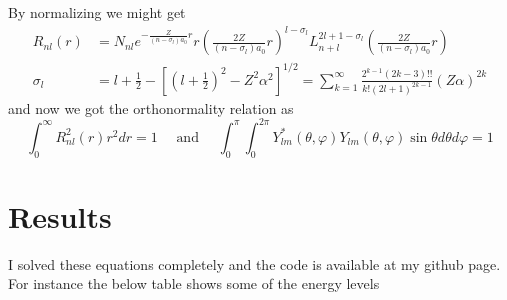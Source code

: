 \documentclass{article}
\begin{document}
By normalizing we might get 
\begin{equation}
\begin{aligned} R_{n l}(r) &=N_{n l} e^{-\frac{Z}{\left(n-\sigma_{l}\right) a_{0}} r} r\left(\frac{2 Z}{\left(n-\sigma_{l}\right) a_{0}} r\right)^{l-\sigma_{l}} L_{n+l}^{2 l+1-\sigma_{l}}\left(\frac{2 Z}{\left(n-\sigma_{l}\right) a_{0}} r\right) \\ \sigma_{l} &=l+\frac{1}{2}-\left[\left(l+\frac{1}{2}\right)^{2}-Z^{2} \alpha^{2}\right]^{1 / 2}=\sum_{k=1}^{\infty} \frac{2^{k-1}(2 k-3) ! !}{k !(2 l+1)^{2 k-1}}(Z \alpha)^{2 k} \end{aligned}
\end{equation}
and now we got the orthonormality relation as
\begin{equation} 
\int_{0}^{\infty} R_{n l}^{2}(r) r^{2} d r=1 \quad \text { and } \quad \int_{0}^{\pi} \int_{0}^{2 \pi} Y_{l m}^{*}(\theta, \varphi) Y_{l m}(\theta, \varphi) \sin \theta d \theta d \varphi=1
\end{equation}

\section{Results}
I solved these equations completely and the code is available at my github page. For instance the below table shows some of the energy levels
\end{document}
